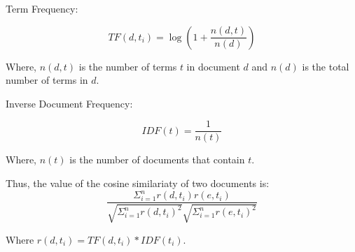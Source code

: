 \documentclass{article}
\begin{document}
Term Frequency: 

\[TF(d, t_i) = \log\left( 1 + \frac{n(d,t)}{n(d)}\right)\]

Where, $n(d,t)$ is the number of terms $t$ in document $d$ and $n(d)$ is the total number of terms in $d$.

Inverse Document Frequency:

\[IDF(t) = \frac{1}{n(t)}\]

Where, $n(t)$ is the number of documents that contain $t$.

Thus, the value of the cosine similariaty of two documents is:
\[ \frac{\Sigma_{i=1}^n r(d, t_i)r(e,t_i)}{\sqrt{\Sigma_{i=1}^nr(d,t_i)^2}\sqrt{\Sigma_{i=1}^nr(e,t_i)^2}}\]

Where $r(d, t_i) = TF(d,t_i)*IDF(t_i)$.
\end{document}
